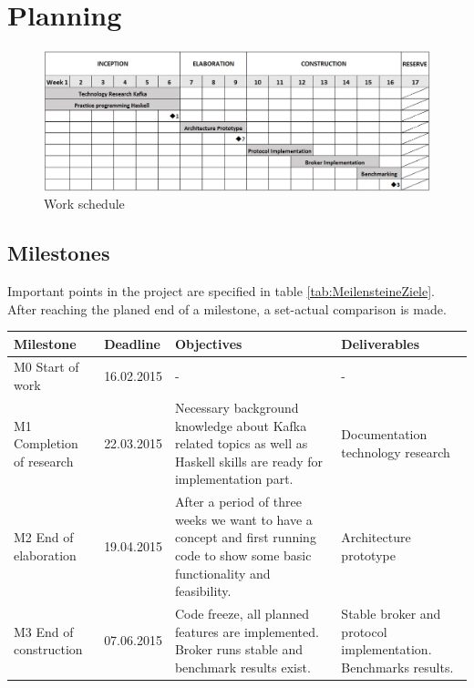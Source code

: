 
\newpage
\section{Planning}

\begin{figure}[H]
    \centering
    \includegraphics[width=1\textwidth]{images/workschedule.png}
    \caption{Work schedule}
    \label{fig:MBig:the-log}
\end{figure}

\subsection{Milestones}
Important points in the project are specified in table
\ref{tab:MeilensteineZiele}. After reaching the planed end of a milestone, a
set-actual comparison is made. 

\begin{tabular}[H]{|p{4cm}|l|p{4.5cm}|p{4.5cm}|}\hline
    \textbf{Milestone} & \textbf{Deadline} & \textbf{Objectives} & \textbf{Deliverables} \\ \hline
    M0 Start of work & 16.02.2015 & - & -\\ \hline
    M1 Completion of research  & 22.03.2015 & 
        Necessary background knowledge about Kafka related topics as well as
        Haskell skills are ready for implementation part. 
        &
        Documentation technology research \\ \hline
    M2 End of elaboration & 19.04.2015 & 
        After a period of three weeks we want to have a concept and first running
        code to show some basic functionality and feasibility. 
        &
        Architecture prototype \\ \hline
    M3 End of construction & 07.06.2015 & 
        Code freeze, all planned features are implemented. Broker runs stable and
        benchmark results exist. 
        &
        Stable broker and protocol implementation. Benchmarks results. \\ \hline
\end{tabular}
\label{tab:MeilensteineZiele}


